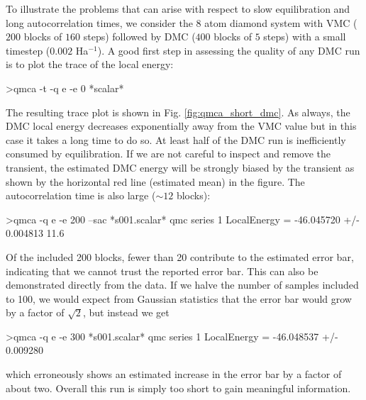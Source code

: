 To illustrate the problems that can arise with respect to slow 
equilibration and long autocorrelation times, we consider the 
8 atom diamond system with VMC ($200$ blocks of $160$ steps) followed 
by DMC ($400$ blocks of $5$ steps) with a small timestep ($0.002$ Ha$^{-1}$).
A good first step in assessing the quality of any DMC run is 
to plot the trace of the local energy:
\begin{shade}
>qmca -t -q e -e 0 *scalar*
\end{shade}
\noindent
The resulting trace plot is shown in Fig. \ref{fig:qmca_short_dmc}.  
As always, the DMC local energy decreases exponentially away from 
the VMC value but in this case it takes a long time to do so.  
At least half of the DMC run is inefficiently consumed by equilibration.
If we are not careful to inspect and remove the transient, the estimated 
DMC energy will be strongly biased by the transient as shown by the 
horizontal red line (estimated mean) in the figure.  The autocorrelation 
time is also large ($\sim 12$ blocks):
\begin{shade}
>qmca -q e -e 200 --sac *s001.scalar*
qmc  series 1  LocalEnergy           =  -46.045720 +/- 0.004813   11.6
\end{shade}
\noindent
Of the included 200 blocks, fewer than 20 contribute to the estimated error 
bar, indicating that we cannot trust the reported error bar.  
This can also be demonstrated directly from the data.  If we halve the number 
of samples included to 100, we would expect from Gaussian statistics 
that the error bar would grow by a factor of $\sqrt{2}$, but instead we 
get
\begin{shade}
>qmca -q e -e 300 *s001.scalar*
qmc  series 1  LocalEnergy           =  -46.048537 +/- 0.009280
\end{shade}
\noindent
which erroneously shows an estimated increase in the error bar by a factor 
of about two.  Overall this run is simply too short to gain meaningful 
information.  

